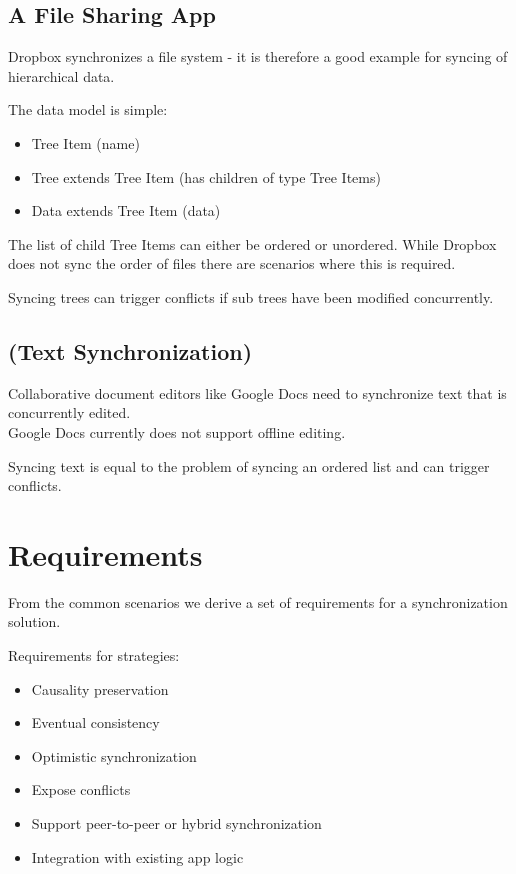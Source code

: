 \subsection{A File Sharing App}

Dropbox synchronizes a file system - it is therefore a good example for
syncing of hierarchical data.

The data model is simple:

\begin{itemize}
\item Tree Item (name)
\item Tree extends Tree Item (has children of type Tree Items)
\item Data extends Tree Item (data)
\end{itemize}

The list of child Tree Items can either be ordered or unordered. While
Dropbox does not sync the order of files there are scenarios where this
is required.

Syncing trees can trigger conflicts if sub trees have been modified
concurrently.

\subsection{(Text Synchronization)}

Collaborative document editors like Google Docs need to synchronize text
that is concurrently edited.\\Google Docs currently does not support
offline editing.

Syncing text is equal to the problem of syncing an ordered list and can
trigger conflicts.

\section{Requirements}
\label{sec:requirements}
From the common scenarios we derive a set of requirements for a synchronization solution.

Requirements for strategies:

\begin{itemize}
\item Causality preservation
\item Eventual consistency
\item Optimistic synchronization
\item Expose conflicts
\item Support peer-to-peer or hybrid synchronization
\item Integration with existing app logic
\end{itemize}

